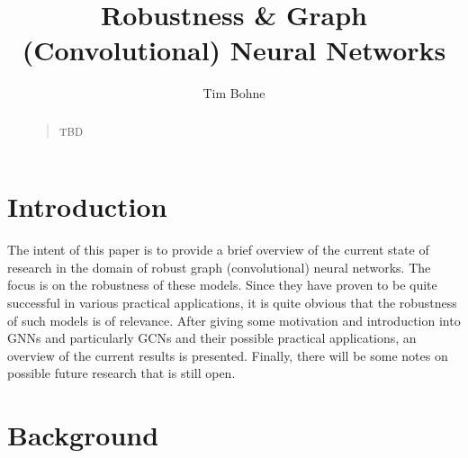 \documentclass[a4paper,preprint]{sig-alternate}
\begin{document}
\title{Robustness \& Graph (Convolutional) Neural Networks}

%
\author{
%
\alignauthor Tim Bohne\\
}

\maketitle


\begin{abstract}
\begin{quote}
TBD
\end{quote}
\end{abstract}

\section{Introduction}

The intent of this paper is to provide a brief overview of the current state of research in the domain of
robust graph (convolutional) neural networks. The focus is on the robustness of these models. Since they have proven to be quite successful in
various practical applications, it is quite obvious that the robustness of such models is of relevance.
After giving some motivation and introduction into GNNs and particularly GCNs and their possible practical applications,
an overview of the current results is presented. Finally, there will be some notes on possible future research that is still open.\newline

\section{Background}
\end{document}
